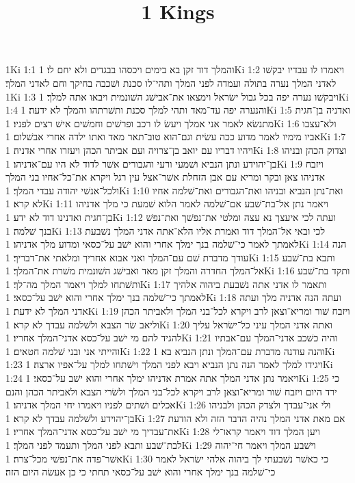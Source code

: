 

\title{1 Kings}

1Ki 1:1  והמלך דוד זקן בא בימים ויכסהו בבגדים ולא יחם לו׃
1Ki 1:2  ויאמרו לו עבדיו יבקשׁו לאדני המלך נערה בתולה ועמדה לפני המלך ותהי־לו סכנת ושׁכבה בחיקך וחם לאדני המלך׃
1Ki 1:3  ויבקשׁו נערה יפה בכל גבול ישׂראל וימצאו את־אבישׁג השׁונמית ויבאו אתה למלך׃
1Ki 1:4  והנערה יפה עד־מאד ותהי למלך סכנת ותשׁרתהו והמלך לא ידעה׃
1Ki 1:5  ואדניה בן־חגית מתנשׂא לאמר אני אמלך ויעשׂ לו רכב ופרשׁים וחמשׁים אישׁ רצים לפניו׃
1Ki 1:6  ולא־עצבו אביו מימיו לאמר מדוע ככה עשׂית וגם־הוא טוב־תאר מאד ואתו ילדה אחרי אבשׁלום׃
1Ki 1:7  ויהיו דבריו עם יואב בן־צרויה ועם אביתר הכהן ויעזרו אחרי אדניה׃
1Ki 1:8  וצדוק הכהן ובניהו בן־יהוידע ונתן הנביא ושׁמעי ורעי והגבורים אשׁר לדוד לא היו עם־אדניהו׃
1Ki 1:9  ויזבח אדניהו צאן ובקר ומריא עם אבן הזחלת אשׁר־אצל עין רגל ויקרא את־כל־אחיו בני המלך ולכל־אנשׁי יהודה עבדי המלך׃
1Ki 1:10  ואת־נתן הנביא ובניהו ואת־הגבורים ואת־שׁלמה אחיו לא קרא׃
1Ki 1:11  ויאמר נתן אל־בת־שׁבע אם־שׁלמה לאמר הלוא שׁמעת כי מלך אדניהו בן־חגית ואדנינו דוד לא ידע׃
1Ki 1:12  ועתה לכי איעצך נא עצה ומלטי את־נפשׁך ואת־נפשׁ בנך שׁלמה׃
1Ki 1:13  לכי ובאי אל־המלך דוד ואמרת אליו הלא־אתה אדני המלך נשׁבעת לאמתך לאמר כי־שׁלמה בנך ימלך אחרי והוא ישׁב על־כסאי ומדוע מלך אדניהו׃
1Ki 1:14  הנה עודך מדברת שׁם עם־המלך ואני אבוא אחריך ומלאתי את־דבריך׃
1Ki 1:15  ותבא בת־שׁבע אל־המלך החדרה והמלך זקן מאד ואבישׁג השׁונמית משׁרת את־המלך׃
1Ki 1:16  ותקד בת־שׁבע ותשׁתחו למלך ויאמר המלך מה־לך׃
1Ki 1:17  ותאמר לו אדני אתה נשׁבעת ביהוה אלהיך לאמתך כי־שׁלמה בנך ימלך אחרי והוא ישׁב על־כסאי׃
1Ki 1:18  ועתה הנה אדניה מלך ועתה אדני המלך לא ידעת׃
1Ki 1:19  ויזבח שׁור ומריא־וצאן לרב ויקרא לכל־בני המלך ולאביתר הכהן וליאב שׂר הצבא ולשׁלמה עבדך לא קרא׃
1Ki 1:20  ואתה אדני המלך עיני כל־ישׂראל עליך להגיד להם מי ישׁב על־כסא אדני־המלך אחריו׃
1Ki 1:21  והיה כשׁכב אדני־המלך עם־אבתיו והייתי אני ובני שׁלמה חטאים׃
1Ki 1:22  והנה עודנה מדברת עם־המלך ונתן הנביא בא׃
1Ki 1:23  ויגידו למלך לאמר הנה נתן הנביא ויבא לפני המלך וישׁתחו למלך על־אפיו ארצה׃
1Ki 1:24  ויאמר נתן אדני המלך אתה אמרת אדניהו ימלך אחרי והוא ישׁב על־כסאי׃
1Ki 1:25  כי ירד היום ויזבח שׁור ומריא־וצאן לרב ויקרא לכל־בני המלך ולשׂרי הצבא ולאביתר הכהן והנם אכלים ושׁתים לפניו ויאמרו יחי המלך אדניהו׃
1Ki 1:26  ולי אני־עבדך ולצדק הכהן ולבניהו בן־יהוידע ולשׁלמה עבדך לא קרא׃
1Ki 1:27  אם מאת אדני המלך נהיה הדבר הזה ולא הודעת את־עבדיך מי ישׁב על־כסא אדני־המלך אחריו׃
1Ki 1:28  ויען המלך דוד ויאמר קראו־לי לבת־שׁבע ותבא לפני המלך ותעמד לפני המלך׃
1Ki 1:29  וישׁבע המלך ויאמר חי־יהוה אשׁר־פדה את־נפשׁי מכל־צרה׃
1Ki 1:30  כי כאשׁר נשׁבעתי לך ביהוה אלהי ישׂראל לאמר כי־שׁלמה בנך ימלך אחרי והוא ישׁב על־כסאי תחתי כי כן אעשׂה היום הזה׃
